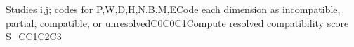 \begin{algorithm}[H]\caption{Deterministic C0--C3 Cross-Paper Comparability Gate}\begin{algorithmic}[1]\Require Studies i,j; codes for P,W,D,H,N,B,M,E\State Code each dimension as incompatible, partial, compatible, or unresolved\State \Return C0\EndIf{}\State \Return C0\State \Return C1\EndIf\State Compute resolved compatibility score S_C\State \Return C1\State \Return C2\Else\State \Return C3\EndIf\end{algorithmic}\end{algorithm}